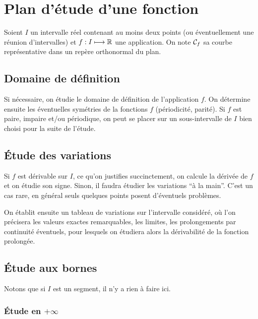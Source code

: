 \chapter{Plan d'étude d'une fonction}

Soient \(I\) un intervalle réel contenant au moins deux points (ou 
éventuellement une réunion d'intervalles) et \(f : I \longmapsto \mathbb{R}\) une 
application. On note \(\mathcal{C}_f\) sa courbe représentative dans un repère 
orthonormal du plan.

\section{Domaine de définition}

Si nécessaire, on étudie le domaine de définition de l'application \(f\). On 
détermine ensuite les éventuelles symétries de la fonctions \(f\) (périodicité, 
parité). Si \(f\) est paire, impaire et/ou périodique, on peut se placer sur un 
sous-intervalle de \(I\) bien choisi pour la suite de l'étude.

\section{Étude des variations}

Si \(f\) est dérivable sur \(I\), ce qu'on justifies succinctement, on calcule 
la dérivée de \(f\) et on étudie son signe. Sinon, il faudra étudier les 
variations ``à la main''. C'est un cas rare, en général seuls quelques points 
posent d'éventuels problèmes.

On établit ensuite un tableau de variations sur l'intervalle considéré, où l'on 
précisera les valeurs exactes remarquables, les limites, les prolongements par 
continuité éventuels, pour lesquels on étudiera alors la dérivabilité de la 
fonction prolongée.

\section{Étude aux bornes}

Notons que si \(I\) est un segment, il n'y a rien à faire ici.

\subsection{Étude en \(+\infty\)}

